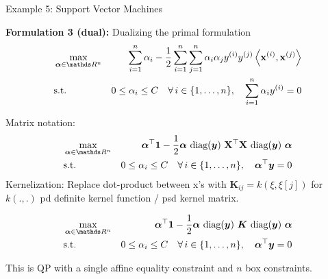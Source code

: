 \documentclass[11pt,compress,t,notes=noshow, xcolor=table]{beamer}
\newcommand{\alphav}{\bm{\alpha}} %
\begin{document}
\begin{frame}{Example 5: Support Vector Machines}

\begin{footnotesize}
\textbf{Formulation 3 (dual): } Dualizing the primal formulation 
\begin{eqnarray*}
	& \max\limits_{\alphav \in \R^n} & \sum_{i=1}^n \alpha_i - \frac{1}{2}\sum_{i=1}^n\sum_{j=1}^n\alpha_i\alpha_j\yi y^{(j)} \scp{\xi}{\xv^{(j)}} \\
	& \text{s.t. } & 0 \le \alpha_i \le C \quad \forall\, i \in \nset, \quad \sum_{i=1}^n \alpha_i \yi = 0
\end{eqnarray*}
\end{footnotesize}


\vspace*{-0.5cm}

\begin{footnotesize}
Matrix notation: 
\begin{eqnarray*}
	& \max\limits_{\alphav \in \R^n} & \bm{\alpha}^\top \bm{1} - \frac{1}{2} \bm{\alpha} ~ \text{diag}(\bm{y}) ~ \Xmat^\top \Xmat ~ \text{diag}(\bm{y})~\bm{\alpha} \\
	& \text{s.t. } & 0 \le \alpha_i \le C \quad \forall\, i \in \nset, \quad \bm{\alpha}^\top \bm{y} = 0
\end{eqnarray*}
Kernelization: Replace dot-product between x's  with $\bm{K}_{ij} = k(\xi, \xi[j])$ for $k(.,.)$ pd definite kernel function / psd kernel matrix. 
\end{footnotesize}


\begin{footnotesize}
\begin{eqnarray*}
	& \max\limits_{\alphav \in \R^n} & \bm{\alpha}^\top \bm{1} - \frac{1}{2} \bm{\alpha} ~ \text{diag}(\bm{y}) ~ \bm{K} ~ \text{diag}(\bm{y})~\bm{\alpha} \\
	& \text{s.t. } & 0 \le \alpha_i \le C \quad \forall\, i \in \nset, \quad \bm{\alpha}^\top \bm{y} = 0
\end{eqnarray*}


\vspace*{0.2cm}

This is QP with a single affine equality constraint and $n$ box constraints. 
\end{footnotesize}

\end{frame}
\end{document}

